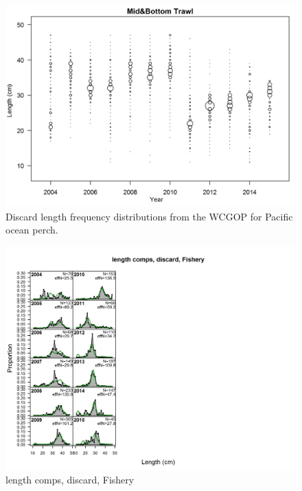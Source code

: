 \documentclass[12pt,]{article}
\begin{document}
\FloatBarrier

\FloatBarrier

\begin{figure}
\centering
\includegraphics{Figures/discardLengthComps.png}
\caption{Discard length frequency distributions from the WCGOP for
Pacific ocean perch. \label{fig:WCGOP_discard}}
\end{figure}

\FloatBarrier

\FloatBarrier

\FloatBarrier

\FloatBarrier

\begin{figure}
\centering
\includegraphics{./r4ss/plots_mod1/comp_lenfit_flt1mkt1.png}
\caption{length comps, discard, Fishery
\label{fig:mod1_1_comp_lenfit_flt1mkt1}}
\end{figure}
\end{document}
